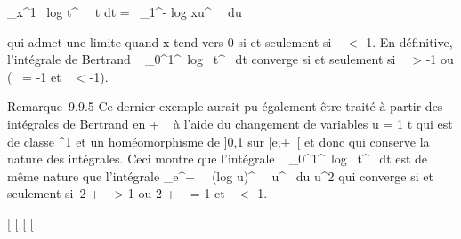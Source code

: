 \documentclass[]{article}
\begin{document}
\int  _x^1\diagupe~
log t^\beta~~
\over t dt =\int ~
_1^- log xu^\beta~~ du

qui admet une limite quand x tend vers 0 si et seulement si~\beta~
\textless{} -1. En définitive, l'intégrale de Bertrand
\int ~
_0^1\diagupet^\alpha~log~
t^\beta~ dt converge si et seulement si~\alpha~ \textgreater{}
-1 ou (\alpha~ = -1 et \beta~ \textless{} -1).

Remarque~9.9.5 Ce dernier exemple aurait pu également être traité à
partir des intégrales de Bertrand en + \infty~ à l'aide du changement de
variables u = 1 \over t qui est de classe
^1 et un homéomorphisme de {]}0,1\diagupe{]} sur {[}e,+\infty~{[} et
donc qui conserve la nature des intégrales. Ceci montre que l'intégrale
\int ~
_0^1\diagupet^\alpha~log~
t^\beta~ dt est de même nature que l'intégrale
\int  _e^+\infty~~
(log u)^\beta~~ \over
u^\alpha~  du \over u^2 qui
converge si et seulement si~2 + \alpha~ \textgreater{} 1 ou 2 + \alpha~ = 1 et \beta~
\textless{} -1.

{[}
{[}
{[}
{[}
\end{document}
